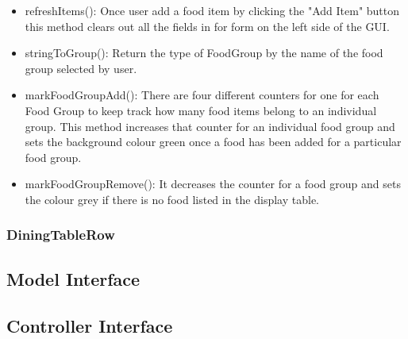 \documentclass{scrreprt}
\begin{document}
\begin{itemize}
	\item refreshItems(): Once user add a food item by clicking the "Add Item" button this method clears out all the fields in for form on the left side of the GUI.
	\item stringToGroup(): Return the type of FoodGroup by the name of the food group selected by user.
	\item markFoodGroupAdd(): There are four different counters for one for each Food Group to keep track how many food items belong to an individual group. This method increases that counter for an individual food group and sets the background colour green 				once a food has been added for a particular food group.
	\item markFoodGroupRemove(): It decreases the counter for a food group and sets the colour grey if there is no food listed in the display table.
\end{itemize}

\subsubsection{DiningTableRow}
\subsection{Model Interface}
\subsection{Controller Interface}

\end{document}

